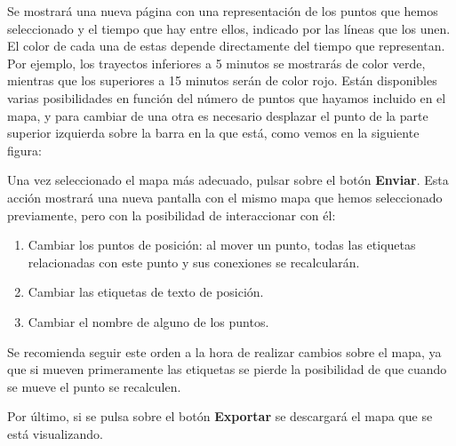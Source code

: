 Se mostrará una nueva página con una representación de los puntos que hemos seleccionado y el tiempo que hay entre ellos, indicado por las líneas que los unen. El color de cada una de estas depende directamente del tiempo que representan. Por ejemplo, los trayectos inferiores a 5 minutos se mostrarás de color verde, mientras que los superiores a 15 minutos serán de color rojo. Están disponibles varias posibilidades en función del número de puntos que hayamos incluido en el mapa, y para cambiar de una otra es necesario desplazar el punto de la parte superior izquierda sobre la barra en la que está, como vemos en la siguiente figura:


Una vez seleccionado el mapa más adecuado, pulsar sobre el botón \textbf{Enviar}. Esta acción mostrará una nueva pantalla con el mismo mapa que hemos seleccionado previamente, pero con la posibilidad de interaccionar con él:
\begin{enumerate}
	\item Cambiar los puntos de posición: al mover un punto, todas las etiquetas relacionadas con este punto y sus conexiones se recalcularán.
	\item Cambiar las etiquetas de texto de posición.
	\item Cambiar el nombre de alguno de los puntos.
\end{enumerate}

Se recomienda seguir este orden a la hora de realizar cambios sobre el mapa, ya que si mueven primeramente las etiquetas se pierde la posibilidad de que cuando se mueve el punto se recalculen.


Por último, si se pulsa sobre el botón \textbf{Exportar} se descargará el mapa que se está visualizando.

